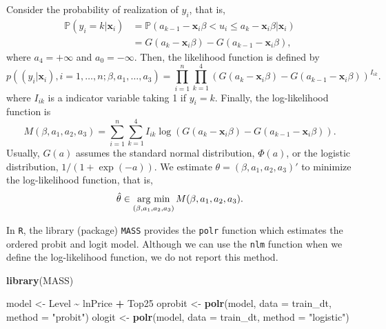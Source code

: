 \documentclass[
  12pt,
]{article}
\newenvironment{Shaded}{\begin{snugshade}}{\end{snugshade}}
\newcommand{\DataTypeTok}[1]{\textcolor[rgb]{0.13,0.29,0.53}{#1}}
\newcommand{\KeywordTok}[1]{\textcolor[rgb]{0.13,0.29,0.53}{\textbf{#1}}}
\newcommand{\NormalTok}[1]{#1}
\newcommand{\OperatorTok}[1]{\textcolor[rgb]{0.81,0.36,0.00}{\textbf{#1}}}
\newcommand{\StringTok}[1]{\textcolor[rgb]{0.31,0.60,0.02}{#1}}
\begin{document}
Consider the probability of realization of \(y_i\), that is,
\begin{equation*}
  \begin{split}
  \mathbb{P}(y_i = k | \mathbf{x}_i) 
  &= \mathbb{P}(a_{k-1} - \mathbf{x}_i \beta < u_i \le a_k - \mathbf{x}_i \beta | \mathbf{x}_i)  \\
  &= G(a_k - \mathbf{x}_i \beta) - G(a_{k-1} - \mathbf{x}_i \beta),
  \end{split}
\end{equation*}
where \(a_{4} = +\infty\) and \(a_0 = -\infty\).
Then, the likelihood function is defined by
\begin{equation*}
  p((y_i|\mathbf{x}_i), i = 1, \ldots, n; \beta, a_1, \ldots, a_3)
  = \prod_{i=1}^n \prod_{k=1}^4 (G(a_k - \mathbf{x}_i \beta) - G(a_{k-1} - \mathbf{x}_i \beta))^{I_{ik}}.
\end{equation*}
where \(I_{ik}\) is a indicator variable taking 1 if \(y_i = k\).
Finally, the log-likelihood function is
\begin{equation*}
  M(\beta, a_1, a_2, a_3) = \sum_{i=1}^n \sum_{k=1}^4 I_{ik} \log(G(a_k - \mathbf{x}_i \beta) - G(a_{k-1} - \mathbf{x}_i \beta)).
\end{equation*}
Usually, \(G(a)\) assumes the standard normal distribution, \(\Phi(a)\), or the logistic distribution, \(1/(1 + \exp(-a))\).
We estimate \(\theta = (\beta, a_1, a_2, a_3)'\) to minimize the log-likelihood function, that is,
\begin{equation*}
  \hat{\theta} \in \mathop{\rm arg~min}\limits_{(\beta, a_1, a_2, a_3)} M(\beta, a_1, a_2, a_3).
\end{equation*}

In \texttt{R}, the library (package) \texttt{MASS} provides the \texttt{polr} function which estimates the ordered probit and logit model.
Although we can use the \texttt{nlm} function when we define the log-likelihood function, we do not report this method.

\begin{Shaded}
\begin{Highlighting}[]
\KeywordTok{library}\NormalTok{(MASS)}

\NormalTok{model \textless{}{-}}\StringTok{ }\NormalTok{Level }\OperatorTok{\textasciitilde{}}\StringTok{ }\NormalTok{lnPrice }\OperatorTok{+}\StringTok{ }\NormalTok{Top25}
\NormalTok{oprobit \textless{}{-}}\StringTok{ }\KeywordTok{polr}\NormalTok{(model, }\DataTypeTok{data =}\NormalTok{ train\_dt, }\DataTypeTok{method =} \StringTok{"probit"}\NormalTok{)}
\NormalTok{ologit \textless{}{-}}\StringTok{ }\KeywordTok{polr}\NormalTok{(model, }\DataTypeTok{data =}\NormalTok{ train\_dt, }\DataTypeTok{method =} \StringTok{"logistic"}\NormalTok{)}
\end{Highlighting}
\end{Shaded}
\end{document}
